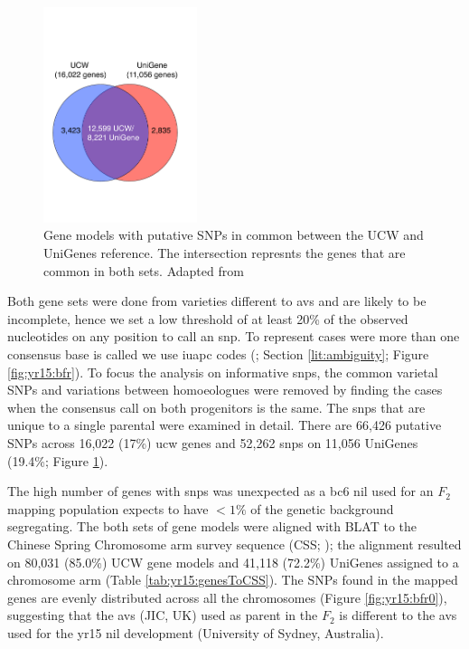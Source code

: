 

\begin{figure}
    \includegraphics[width=0.4\textwidth]{Yr15/Figures/geneCounts.pdf} 
    \caption{Gene models with putative SNPs in common between the UCW and UniGenes reference. The intersection represnts the genes that are common in both sets. Adapted from \citet{Ramirez-Gonzalez2015b}}
    \label{fig:yr15:geneCount}
\end{figure}

Both gene sets were done from varieties different to \acrshort{avs} and are likely to be incomplete, hence we set a low threshold of at least 20\% of the observed nucleotides on any position to call an \acrshort{snp}. 
To represent cases were more than one consensus base is called we use \gls{iuapc} codes (\citet{Cornish-Bowden1985}; Section \ref{lit:ambiguity}; Figure \ref{fig:yr15:bfr}).  
To focus the analysis on informative \acrshort{snp}s, the common varietal SNPs and variations between homoeologues were removed by finding the cases when the consensus call on both progenitors is the same. 
The \acrshort{snp}s that are unique to a single parental were examined in detail. 
There are 66,426 putative SNPs across 16,022 (17\%) \acrshort{ucw} genes and 52,262 \acrshort{snp}s on 11,056 UniGenes (19.4\%; Figure \ref{fig:yr15:geneCount}).  




The high number of genes with \acrshort{snp}s was unexpected as a \acrshort{bc}6 \acrshort{nil} used for an $F_2$ mapping population expects to have $<1\%$ of the genetic background segregating. 
The both sets of gene models were aligned with BLAT \citep{Kent2002} to the Chinese Spring Chromosome arm survey sequence (CSS; \citealt{Mayer2014}); the alignment resulted on 80,031 (85.0\%) UCW gene models and 41,118 (72.2\%) UniGenes assigned to a chromosome arm (Table \ref{tab:yr15:genesToCSS}). 
The SNPs found in the mapped genes are evenly distributed across all the chromosomes (Figure \ref{fig:yr15:bfr0}), suggesting that the \acrlong{avs} (JIC, UK) used as parent in the $F_{2}$ is different to the \acrlong{avs} used for the \acrshort{yr15} \acrshort{nil} development (University of Sydney, Australia).  


